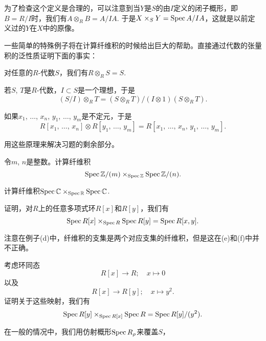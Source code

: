 为了检查这个定义是合理的，可以注意到当$Y$是$S$的由$I$定义的闭子概形，即$B=R/I$时，我们有$A\otimes_R B=A/IA$. 于是$X\times_S Y=\operatorname{Spec} A/IA$，这就是以前定义过的$Y$在$X$中的原像。

\begin{exe}
一些简单的特殊例子将在计算纤维积的时候给出巨大的帮助。直接通过代数的张量积的泛性质证明下面的事实：

\begin{compactenum}[(a)]
\item 对任意的$R$\hyp 代数$S$，我们有$R\otimes_R S=S$.
\item 若$S$, $T$是$R$\hyp 代数，$I\subset S$是一个理想，于是
\[
	(S/I)\otimes_R T=(S\otimes_R T)/(I\otimes 1)(S\otimes_R T).
\]
\item 如果$x_1$, $\dots$, $x_n$, $y_1$, $\dots$, $y_m$是不定元，于是
\[
	R[\text{$x_1$, $\dots$, $x_n$}]\otimes R[\text{$y_1$, $\dots$, $y_m$}]=R[\text{$x_1$, $\dots$, $x_n$, $y_1$, $\dots$, $y_m$}].
\]
\end{compactenum}
用这些原理来解决习题的剩余部分。
\begin{compactenum}[(a)] \setcounter{enumi}{3}
\item 令$m$, $n$是整数。计算纤维积
\[
	\operatorname{Spec} \mathbb{Z}/(m)\times_{\operatorname{Spec} \mathbb{Z}} \operatorname{Spec} \mathbb{Z}/(n).
\]
\item 计算纤维积$\operatorname{Spec} \mathbb{C} \times_{\operatorname{Spec} \mathbb{R}} \operatorname{Spec} \mathbb{C}$.
\item 证明，对$R$上的任意多项式环$R[x]$和$R[y]$，我们有
\[
	\operatorname{Spec} R[x]\times_{\operatorname{Spec} R}\operatorname{Spec} R[y]=\operatorname{Spec} R[x,y].
\]
\end{compactenum}
注意在例子(d)中，纤维积的支集是两个对应支集的纤维积，但是这在(e)和(f)中并不正确。
\begin{compactenum}[(a)] \setcounter{enumi}{6}
\item 考虑环同态
\[
	R[x]\to R;\quad x\mapsto 0
\]
以及
\[
	R[x]\to R[y];\quad x\mapsto y^2.
\]
证明关于这些映射，我们有
\[
	\operatorname{Spec} R[y]\times_{\operatorname{Spec} R[x]}\operatorname{Spec} R=\operatorname{Spec} R[y]/(y^2).
\]
\end{compactenum}

在一般的情况中，我们用仿射概形$\operatorname{Spec} R_\rho$来覆盖$S$，
\end{exe}